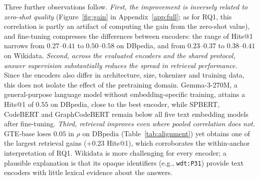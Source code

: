 \documentclass[runningheads]{llncs}
\begin{document}
Three further observations follow. \emph{First, the improvement is inversely
related to zero-shot quality} (Figure~\ref{fig:gain} in Appendix~\ref{app:full}; as for RQ1, this correlation is partly an artifact of
computing the gain from the zero-shot value), and fine-tuning compresses the
differences between encoders: the range of Hits@1 narrows from
$0.27$--$0.41$ to $0.50$--$0.58$ on DBpedia, and from $0.23$--$0.37$ to
$0.38$--$0.41$ on Wikidata. \emph{Second, across the evaluated encoders and the shared protocol,
answer supervision substantially reduces the spread in retrieval
performance.} Since the encoders also differ in architecture, size, tokenizer
and training data, this does not isolate the effect of the pretraining domain.
Gemma-3-270M, a general-purpose language model without
embedding-specific training, attains a Hits@1 of $0.55$ on DBpedia, close to
the best encoder, while SPBERT, CodeBERT and GraphCodeBERT remain below all
five text embedding models after fine-tuning. \emph{Third, retrieval improves
even where pooled correlation does not.} GTE-base loses $0.05$ in $\rho$ on
DBpedia (Table~\ref{tab:alignment}) yet obtains one of the largest retrieval
gains ($+0.23$ Hits@1), which corroborates the within-anchor interpretation of
RQ1. Wikidata is more challenging for every encoder; a plausible explanation
is that its opaque identifiers (e.g., \texttt{wdt:P31}) provide text encoders
with little lexical evidence about the answers.
\end{document}
